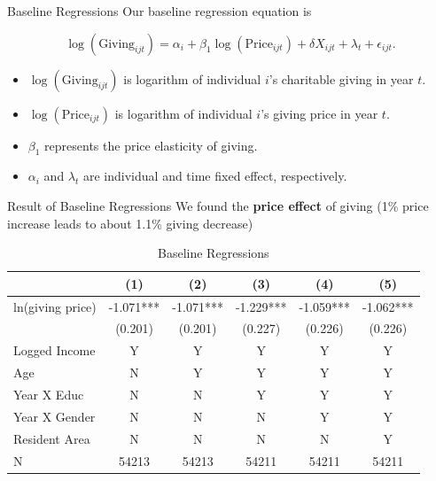 \documentclass[
  ignorenonframetext,
]{beamer}
\providecommand{\tightlist}{%
  \setlength{\itemsep}{0pt}\setlength{\parskip}{0pt}}
\begin{document}
\begin{frame}{Baseline Regressions}
\protect\hypertarget{baseline-regressions}{}
Our baseline regression equation is

\[
    \log(\text{Giving}_{ijt}) = 
    \alpha_i + \beta_1 \log(\text{Price}_{ijt}) + \delta X_{ijt} + \lambda_t + \epsilon_{ijt}.
\]

\begin{itemize}
\tightlist
\item
  \(\log(\text{Giving}_{ijt})\) is logarithm of individual \(i\)'s
  charitable giving in year \(t\).
\item
  \(\log(\text{Price}_{ijt})\) is logarithm of individual \(i\)'s giving
  price in year \(t\).
\item
  \(\beta_1\) represents the price elasticity of giving.
\item
  \(\alpha_i\) and \(\lambda_t\) are individual and time fixed effect,
  respectively.
\end{itemize}
\end{frame}

\begin{frame}{Result of Baseline Regressions}
\protect\hypertarget{result-of-baseline-regressions}{}
We found the \textbf{price effect} of giving (1\% price increase leads
to about 1.1\% giving decrease)

\begin{table}

\caption{\label{tab:kableEstimateElasticity}Baseline Regressions}
\centering
\fontsize{9}{11}\selectfont
\begin{tabular}[t]{lccccc}
\toprule
 & (1) & (2) & (3) & (4) & (5)\\
\midrule
ln(giving price) & -1.071*** & -1.071*** & -1.229*** & -1.059*** & -1.062***\\
 & (0.201) & (0.201) & (0.227) & (0.226) & (0.226)\\
Logged Income & Y & Y & Y & Y & Y\\
Age & N & Y & Y & Y & Y\\
Year X Educ & N & N & Y & Y & Y\\
Year X Gender & N & N & N & Y & Y\\
Resident Area & N & N & N & N & Y\\
N & 54213 & 54213 & 54211 & 54211 & 54211\\
\bottomrule
\end{tabular}
\end{table}
\end{frame}
\end{document}
